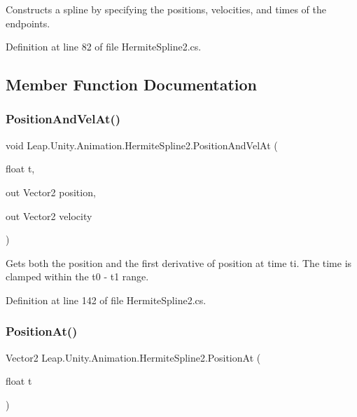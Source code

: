 Constructs a spline by specifying the positions, velocities, and times of the endpoints. 



Definition at line 82 of file Hermite\+Spline2.\+cs.



\subsection{Member Function Documentation}
\mbox{\label{struct_leap_1_1_unity_1_1_animation_1_1_hermite_spline2_ac3f9bec89052e73ed010005e8d965ecc}} 
\subsubsection{\texorpdfstring{PositionAndVelAt()}{PositionAndVelAt()}}
{\footnotesize\ttfamily void Leap.\+Unity.\+Animation.\+Hermite\+Spline2.\+Position\+And\+Vel\+At (\begin{DoxyParamCaption}\item[{float}]{t,  }\item[{out Vector2}]{position,  }\item[{out Vector2}]{velocity }\end{DoxyParamCaption})}



Gets both the position and the first derivative of position at time ti. The time is clamped within the t0 -\/ t1 range. 



Definition at line 142 of file Hermite\+Spline2.\+cs.

\mbox{\label{struct_leap_1_1_unity_1_1_animation_1_1_hermite_spline2_a042056e2d33965a7b2101f1a9b78b5e7}} 
\subsubsection{\texorpdfstring{PositionAt()}{PositionAt()}}
{\footnotesize\ttfamily Vector2 Leap.\+Unity.\+Animation.\+Hermite\+Spline2.\+Position\+At (\begin{DoxyParamCaption}\item[{float}]{t }\end{DoxyParamCaption})}



